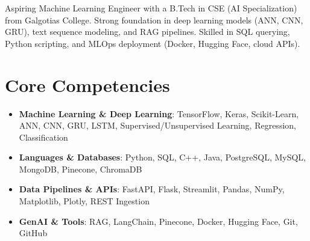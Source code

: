\documentclass[11pt,a4paper,sans]{moderncv}
\begin{document}
\makecvtitle

\vspace{6pt}
\small{Aspiring Machine Learning Engineer with a B.Tech in CSE (AI Specialization) from Galgotias College. Strong foundation in deep learning models (ANN, CNN, GRU), text sequence modeling, and RAG pipelines. Skilled in SQL querying, Python scripting, and MLOps deployment (Docker, Hugging Face, cloud APIs).}

\section{Core Competencies}
\vspace{1pt}
\begin{itemize}
\item \textbf{Machine Learning \& Deep Learning}: TensorFlow, Keras, Scikit-Learn, ANN, CNN, GRU, LSTM, Supervised/Unsupervised Learning, Regression, Classification
\item \textbf{Languages \& Databases}: Python, SQL, C++, Java, PostgreSQL, MySQL, MongoDB, Pinecone, ChromaDB
\item \textbf{Data Pipelines \& APIs}: FastAPI, Flask, Streamlit, Pandas, NumPy, Matplotlib, Plotly, REST Ingestion
\item \textbf{GenAI \& Tools}: RAG, LangChain, Pinecone, Docker, Hugging Face, Git, GitHub
\end{itemize}
\end{document}
